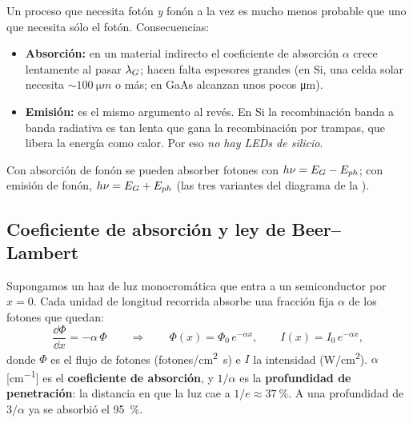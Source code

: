 \begin{intuicion}
Un proceso que necesita fotón \emph{y} fonón a la vez es mucho menos probable que uno que
necesita sólo el fotón. Consecuencias:
\begin{itemize}
  \item \textbf{Absorción:} en un material indirecto el coeficiente de absorción $\alpha$
  crece lentamente al pasar $\lambda_G$; hacen falta espesores grandes (en Si, una celda solar
  necesita $\sim\SI{100}{\micro m}$ o más; en GaAs alcanzan unos pocos \si{\micro m}).
  \item \textbf{Emisión:} es el mismo argumento al revés. En Si la recombinación
  banda a banda radiativa es tan lenta que gana la recombinación por trampas, que
  libera la energía como calor. Por eso \emph{no hay LEDs de silicio}.
\end{itemize}
Con absorción de fonón se pueden absorber fotones con $h\nu=E_G-E_{ph}$; con emisión de
fonón, $h\nu=E_G+E_{ph}$ (las tres variantes del diagrama de la ).
\end{intuicion}

\subsection{Coeficiente de absorción y ley de Beer--Lambert}

Supongamos un haz de luz monocromática que entra a un semiconductor por $x=0$. Cada
unidad de longitud recorrida absorbe una fracción fija $\alpha$ de los fotones
que quedan:
\[
  \frac{\dd\Phi}{\dd x} = -\alpha\,\Phi
  \qquad\Longrightarrow\qquad
  \Phi(x) = \Phi_0\,e^{-\alpha x},\qquad I(x)=I_0\,e^{-\alpha x},
\]
donde $\Phi$ es el flujo de fotones (fotones/\si{cm^2.s}) e $I$ la intensidad
(\si{W/cm^2}). $\alpha$ [\si{cm^{-1}}] es el \textbf{coeficiente de absorción}, y
$1/\alpha$ es la \textbf{profundidad de penetración}: la distancia en que la luz cae a
$1/e\approx\SI{37}{\percent}$. A una profundidad de $3/\alpha$ ya se absorbió el
\SI{95}{\percent}.

